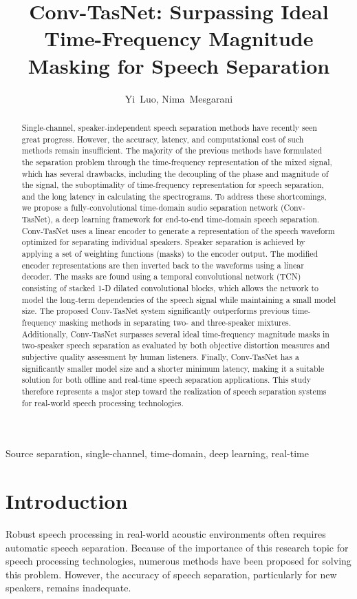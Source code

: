 \documentclass[journal]{IEEEtran}
\title{Conv-TasNet: Surpassing Ideal Time-Frequency Magnitude Masking for Speech Separation}
\author{Yi~Luo, Nima~Mesgarani}
\begin{document}
\maketitle
\begin{abstract}
Single-channel, speaker-independent speech separation methods have recently seen great progress. However, the accuracy, latency, and computational cost of such methods remain insufficient. The majority of the previous methods have formulated the separation problem through the time-frequency representation of the mixed signal, which has several drawbacks, including the decoupling of the phase and magnitude of the signal, the suboptimality of time-frequency representation for speech separation, and the long latency in calculating the spectrograms. To address these shortcomings, we propose a fully-convolutional time-domain audio separation network (Conv-TasNet), a deep learning framework for end-to-end time-domain speech separation. Conv-TasNet uses a linear encoder to generate a representation of the speech waveform optimized for separating individual speakers. Speaker separation is achieved by applying a set of weighting functions (masks) to the encoder output. The modified encoder representations are then inverted back to the waveforms using a linear decoder. The masks are found using a temporal convolutional network (TCN) consisting of stacked 1-D dilated convolutional blocks, which allows the network to model the long-term dependencies of the speech signal while maintaining a small model size. The proposed Conv-TasNet system significantly outperforms previous time-frequency masking methods in separating two- and three-speaker mixtures. Additionally, Conv-TasNet surpasses several ideal time-frequency magnitude masks in two-speaker speech separation as evaluated by both objective distortion measures and subjective quality assessment by human listeners. Finally, Conv-TasNet has a significantly smaller model size and a shorter minimum latency, making it a suitable solution for both offline and real-time speech separation applications. This study therefore represents a major step toward the realization of speech separation systems for real-world speech processing technologies. \end{abstract}
\begin{IEEEkeywords}
Source separation, single-channel, time-domain, deep learning, real-time
\end{IEEEkeywords}
\section{Introduction}
\label{sec:intro}
Robust speech processing in real-world acoustic environments often requires automatic speech separation. Because of the importance of this research topic for speech processing technologies, numerous methods have been proposed for solving this problem. However, the accuracy of speech separation, particularly for new speakers, remains inadequate.
\end{document}
